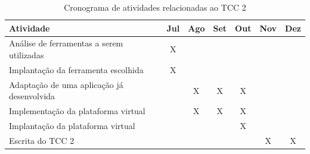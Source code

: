 \begin{table}[!h]
\centering
\caption{Cronograma de atividades relacionadas ao TCC 2}
\label{cronograma_tcc2}
\begin{tabular}{|p{9cm}|c|c|c|c|c|c|}
\hline
Atividade                                                   & \multicolumn{1}{l|}{Jul} & \multicolumn{1}{l|}{Ago} & \multicolumn{1}{l|}{Set} & \multicolumn{1}{l|}{Out} & \multicolumn{1}{l|}{Nov} & \multicolumn{1}{l|}{Dez} \\ \hline
Análise de ferramentas a serem utilizadas                   & X                           &                             &                              &                            &                             &                              \\ \hline
Implantação da ferramenta escolhida                         & X                           &                             &                              &                            &                             &                              \\ \hline
Adaptação de uma aplicação já desenvolvida                  &                             & X                              & X                            & X                          &                             &                              \\ \hline
Implementação da plataforma virtual                         &                             & X                       & X                            & X                          &                             &                              \\ \hline
Implantação da plataforma virtual                           &                             &                         &                              & X                          &                             &                              \\ \hline
Escrita do TCC 2                                            &                             &                             &                              &                            & X                           & X          \\ \hline
\end{tabular}
\end{table}


